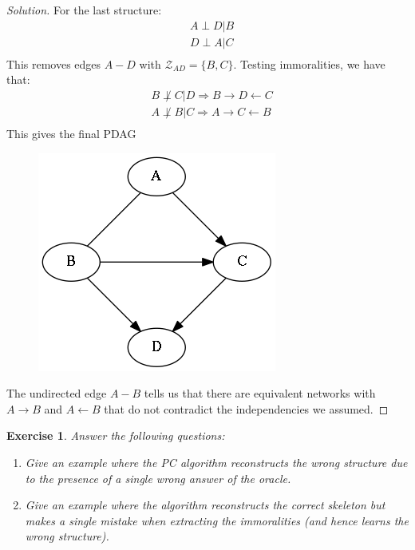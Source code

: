 \documentclass{amsart}
\theoremstyle{plain}
\newtheorem{exercise}{Exercise}
\newenvironment{solution}{\begin{proof}[Solution]}{\end{proof}}
\newcommand{\set}[1]{\mathcal{#1}}
\renewcommand{\implies}{\Rightarrow}
\begin{document}
\begin{solution}
  For the last structure:
  \begin{align*}
    &A\perp D|B\\
    &D\perp A|C\\
  \end{align*}
  This removes edges $A-D$ with $\set{Z}_{AD}=\{B,C\}$. Testing immoralities, we have that:
  \begin{align*}
    &B\not\perp C|D \implies B\to D\gets C\\
    &A\not\perp B|C \implies A\to C\gets B\\
  \end{align*}
  This gives the final PDAG
  \begin{figure}[h]
    \centering\includegraphics[scale=0.3]{graphs/ex1_c.png}
  \end{figure}
  The undirected edge $A-B$ tells us that there are equivalent networks with $A\to B$ and
  $A\gets B$ that do not contradict the independencies we assumed.
\end{solution}

\begin{exercise}
  Answer the following questions:
  \begin{enumerate}[label=(\roman*)]
    \item Give an example where the PC algorithm reconstructs the wrong structure due to the
      presence of a single wrong answer of the oracle.
    \item Give an example where the algorithm reconstructs the correct skeleton but makes a single
      mistake when extracting the immoralities (and hence learns the wrong structure).
  \end{enumerate}
\end{exercise}
\end{document}

